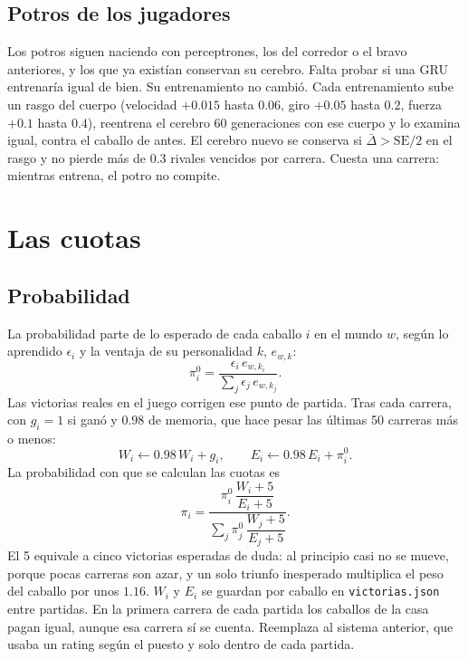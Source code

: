 \documentclass[11pt,letterpaper]{article}
\begin{document}
\subsection{Potros de los jugadores}
Los potros siguen naciendo con perceptrones, los del corredor o el bravo anteriores, y los que ya existían conservan su cerebro. Falta probar si una GRU entrenaría igual de bien. Su entrenamiento no cambió. Cada entrenamiento sube un rasgo del cuerpo (velocidad $+0.015$ hasta $0.06$, giro $+0.05$ hasta $0.2$, fuerza $+0.1$ hasta $0.4$), reentrena el cerebro 60 generaciones con ese cuerpo y lo examina igual, contra el caballo de antes. El cerebro nuevo se conserva si $\bar\Delta > \mathrm{SE}/2$ en el rasgo y no pierde más de $0.3$ rivales vencidos por carrera. Cuesta una carrera: mientras entrena, el potro no compite.

\section{Las cuotas}
\subsection{Probabilidad}
La probabilidad parte de lo esperado de cada caballo $i$ en el mundo $w$, según lo aprendido $\epsilon_i$ y la ventaja de su personalidad $k$, $e_{w,k}$:
\begin{equation}
\pi^{0}_i = \frac{\epsilon_i\, e_{w,k_i}}{\sum_j \epsilon_j\, e_{w,k_j}}.
\end{equation}
Las victorias reales en el juego corrigen ese punto de partida. Tras cada carrera, con $g_i = 1$ si ganó y $0.98$ de memoria, que hace pesar las últimas 50 carreras más o menos:
\begin{equation}
W_i \leftarrow 0.98\, W_i + g_i, \qquad E_i \leftarrow 0.98\, E_i + \pi^{0}_i.
\end{equation}
La probabilidad con que se calculan las cuotas es
\begin{equation}
\pi_i = \frac{\pi^{0}_i\, \dfrac{W_i + 5}{E_i + 5}}{\sum_j \pi^{0}_j\, \dfrac{W_j + 5}{E_j + 5}}.
\end{equation}
El 5 equivale a cinco victorias esperadas de duda: al principio casi no se mueve, porque pocas carreras son azar, y un solo triunfo inesperado multiplica el peso del caballo por unos $1.16$. $W_i$ y $E_i$ se guardan por caballo en \texttt{victorias.json} entre partidas. En la primera carrera de cada partida los caballos de la casa pagan igual, aunque esa carrera sí se cuenta. Reemplaza al sistema anterior, que usaba un rating según el puesto y solo dentro de cada partida.
\end{document}

